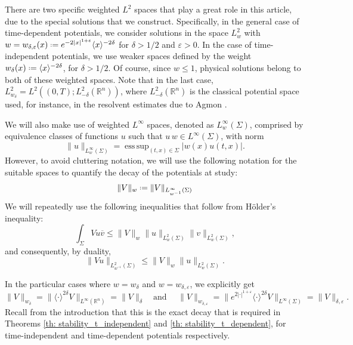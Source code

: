\documentclass[10pt,a4paper]{amsart}
\theoremstyle{remark}
\theoremstyle{definition}
\DeclareMathOperator*{\esssup}{ess\,sup}
\newcommand{\R}{\mathbb{R}}
\newcommand*{\defeq}{\mathrel{\vcenter{\baselineskip0.5ex \lineskiplimit0pt
			\hbox{\scriptsize.}\hbox{\scriptsize.}}}%
	=}
\def\ve{\varepsilon}
\begin{document}
There are two specific weighted $L^2$ spaces that play a great role in this article, due to the special solutions that we construct.  Specifically, in the general case of time-dependent potentials, we consider solutions in the space $L^2_w$ with $w=w_{\delta,\ve}(x)\defeq e^{-2|x|^{1+\varepsilon}}\langle x\rangle^{-2\delta}$ for $\delta>1/2$ and $\ve>0$. In the case of time-independent potentials, we use weaker spaces defined by the weight $w_{\delta}(x)\defeq \langle x\rangle^{-2\delta}$, for $\delta>1/2$. Of course, since $w\leq 1$, physical solutions belong to both of these weighted spaces. 
%
Note that in the last case, $L^2_{w_\delta} = L^2((0,T);L^2_{-\delta}(\R^n))$, where $L^2_{-\delta}(\R^n)$ is the classical potential space used, for instance, in the resolvent estimates due to Agmon \cite{Agmon1975}.
%


 We will also make use of weighted $L^\infty$ spaces, denoted as $L^\infty_w(\Sigma)$, comprised by equivalence classes of functions $u$ such that $ u \, w \in L^\infty(\Sigma)$, with norm
%
 \[
 \|u\|_{L^\infty_w(\Sigma)}=\esssup_{(t,x)\in\Sigma} |w(x) u(t,x)|.
 \]
%
However, to avoid cluttering notation, we will use the following notation for the suitable spaces to quantify the decay of the potentials at study:
% 
\[
\|V\|_w\defeq \|V\|_{L^\infty_{w^{-1}}(\Sigma)}
\]
%
We will repeatedly use the following inequalities that follow from H\"older's inequality:
%
\begin{equation}\label{eq: Holder_weighted}
\int_{\Sigma} Vu\overline{v}\leq \|V\|_w\|u\|_{L^2_w(\Sigma)}\|v\|_{L^2_w(\Sigma)},
\end{equation}
%
and consequently, by duality,
%
\[\|V u\|_{L^2_{w^{-1}}(\Sigma)}\leq \|V\|_w\|u\|_{L^2_w(\Sigma)}.\]

In the particular cases where $w=w_\delta$ and $w=w_{\delta, \ve}$, we explicitly get  
%
\[
\|V\|_{w_\delta} = \| \langle \cdot \rangle^{2\delta} V\|_{L^\infty(\R^n)} = \|V\|_\delta
%
\quad \text{and } \quad
%
\|V\|_{w_{\delta, \ve}} = \| e^{2|\cdot|^{1+\ve}} \langle \cdot \rangle^{2\delta} V\|_{L^\infty(\Sigma)}=\|V\|_{\delta, \ve} .
\]
%
Recall from the introduction that this is the exact decay that is required in Theorems \ref{th: stability_t_independent} and \ref{th: stability_t_dependent}, for time-independent and time-dependent potentials respectively.
\end{document}
